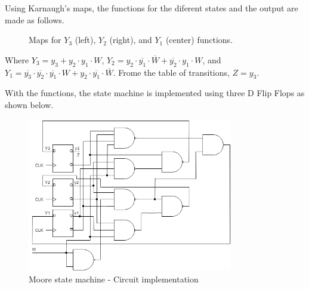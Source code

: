 Using Karnaugh's maps, the functions for
the diferent states and the output are made
as follows.

\begin{figure}[H]
    \begin{center}
    \begin{Karnaugh}
    \end{Karnaugh}
    \begin{Karnaugh}
    \end{Karnaugh}
    \begin{Karnaugh}
    \end{Karnaugh}
    \caption{Maps for $Y_3$ (left), $Y_2$ (right), and $Y_1$ (center) functions.}
\end{center}
\end{figure}
Where $Y_3 = y_3 + y_2 \cdot y_1 \cdot W$, $Y_2 = y_2 \cdot \overline{y_1} \cdot \overline{W} + \overline{y_2} \cdot y_1 \cdot W$,
and $Y_1 = \overline{y_3} \cdot \overline{y_2} \cdot \overline{y_1} \cdot W + y_2 \cdot \overline{y_1} \cdot \overline{W}$.
Frome the table of transitions, $Z = y_3$.

With the functions, the state machine is 
implemented using three D Flip Flops as shown below.

\begin{figure}[H]
    \begin{centering}
    \includegraphics[width=0.8\textwidth]{data/Graficos2/2a_Compuertas_Moore.png}
    \par\end{centering}
    \caption{Moore state machine  - Circuit implementation}
\end{figure}

